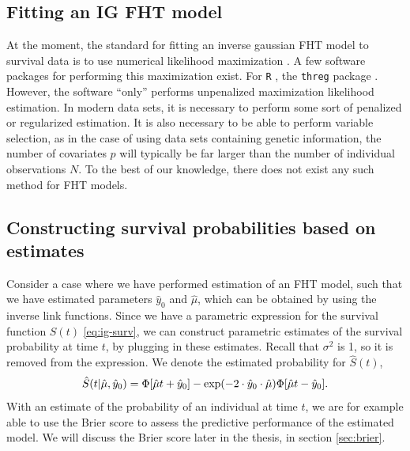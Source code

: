 \subsection{Fitting an IG FHT model}
At the moment, the standard for fitting an inverse gaussian FHT model to survival data is to use numerical likelihood maximization \citep{caroni2017}.
A few software packages for performing this maximization exist.
For \verb|R| \citep{Rlang}, the \verb|threg| package \citep{threg}.
However, the software ``only'' performs unpenalized maximization likelihood estimation.
In modern data sets, it is necessary to perform some sort of penalized or regularized estimation.
It is also necessary to be able to perform variable selection, as in the case of using data sets containing genetic information, the number of covariates $p$ will typically be far larger than the number of individual observations $N$.
To the best of our knowledge, there does not exist any such method for FHT models.

\subsection{Constructing survival probabilities based on estimates}
Consider a case where we have performed estimation of an FHT model, such that we have estimated parameters $\hat{y}_0$ and $\hat{\mu}$, which can be obtained by using the inverse link functions.
Since we have a parametric expression for the survival function $S(t)$ \eqref{eq:ig-surv}, we can construct parametric estimates of the survival probability at time $t$, by plugging in these estimates.
Recall that $\sigma^2$ is 1, so it is removed from the expression.
We denote the estimated probability for $\hat{S}(t)$,
\begin{equation*}
    \hat{S}(t|\hat{\mu},\hat{y}_0)=\Phi\sqb*{\hat{\mu} t+\hat{y}_0}-\exp\p*{-2\cdot\hat{y}_0\cdot\hat{\mu}}\Phi\sqb*{\hat{\mu} t-\hat{y}_0}.
\end{equation*}
With an estimate of the probability of an individual at time $t$, we are for example able to use the Brier score to assess the predictive performance of the estimated model.
We will discuss the Brier score later in the thesis, in section \ref{sec:brier}.


